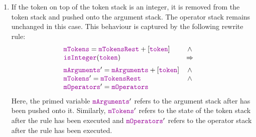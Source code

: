 \begin{enumerate}
\item If the token on top of the token stack is an integer, it is removed from the token stack and pushed onto
      the argument stack.  The operator stack remains unchanged in this case.
      This behaviour is captured by the following rewrite rule:
      $$\begin{array}{lcll}
          \mytt{mTokens} = \mytt{mTokensRest} + [\mytt{token} ] & \wedge & \\
          \mytt{isInteger}(\mytt{token}) & \Rightarrow  \\[0.2cm]
                   \mytt{mArguments}' = \mytt{mArguments} + [\mytt{token}] & \wedge \\
                   \mytt{mTokens}' = \mytt{mTokensRest} & \wedge \\
                   \mytt{mOperators}' = \mytt{mOperators}
       \end{array} 
     $$
      Here, the primed variable $\mytt{mArguments}'$ refers to the argument stack after  
      has been pushed onto it.  Similarly, $\mytt{mTokens}'$ refers to the state of the token stack after the
      rule has been executed and $\mytt{mOperators}'$ refers to the operator stack after the rule has been executed.
 

\end{enumerate}
